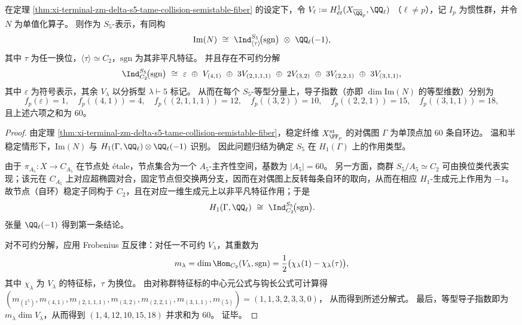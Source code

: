 \begin{theorem}\label{thm:xi-terminal-zm-delta-s5-tame-collision-monodromy-induced-sgn}
在定理 \ref{thm:xi-terminal-zm-delta-s5-tame-collision-semistable-fiber} 的设定下，令
\(
V_\ell:=H^1_{\acute e t}(X_{\overline{\QQ}_p},\QQ_\ell)
\)
（\(\ell\neq p\)），记 \(I_p\) 为惯性群，并令 \(N\) 为单值化算子。
则作为 \(S_5\)-表示，有同构
\[
\mathrm{Im}(N)\ \cong\ \Ind^{S_5}_{\langle\tau\rangle}\!\bigl(\mathrm{sgn}\bigr)\ \otimes\ \QQ_\ell(-1),
\]
其中 \(\tau\) 为任一换位，\(\langle\tau\rangle\simeq C_2\)，\(\mathrm{sgn}\) 为其非平凡特征。
并且存在不可约分解
\[
\Ind^{S_5}_{C_2}\!\bigl(\mathrm{sgn}\bigr)
\ \cong\
\varepsilon\ \oplus\ V_{(4,1)}\ \oplus\ 3V_{(2,1,1,1)}\ \oplus\ 2V_{(3,2)}\ \oplus\ 3V_{(2,2,1)}\ \oplus\ 3V_{(3,1,1)},
\]
其中 \(\varepsilon\) 为符号表示，其余 \(V_\lambda\) 以分拆型 \(\lambda\vdash 5\) 标记。
从而在每个 \(S_5\)-等型分量上，导子指数（亦即 \(\dim\mathrm{Im}(N)\) 的等型维数）分别为
\[
f_p(\varepsilon)=1,\quad
f_p((4,1))=4,\quad
f_p((2,1,1,1))=12,\quad
f_p((3,2))=10,\quad
f_p((2,2,1))=15,\quad
f_p((3,1,1))=18,
\]
且上述六项之和为 \(60\)。
\end{theorem}
\begin{proof}
由定理 \ref{thm:xi-terminal-zm-delta-s5-tame-collision-semistable-fiber}，稳定纤维 \(X^{\mathrm{st}}_{\FF_p}\) 的对偶图 \(\Gamma\) 为单顶点加 \(60\) 条自环边。
温和半稳定情形下，\(\mathrm{Im}(N)\) 与 \(H_1(\Gamma,\QQ_\ell)\otimes \QQ_\ell(-1)\) 识别。
因此问题归结为确定 \(S_5\) 在 \(H_1(\Gamma)\) 上的作用类型。
\par
由于 \(\pi_{A_5}:X\to C_{A_5}\) 在节点处 \'etale，节点集合为一个 \(A_5\)-主齐性空间，基数为 \(|A_5|=60\)。
另一方面，商群 \(S_5/A_5\simeq C_2\) 可由换位类代表实现；该元在 \(C_{A_5}\) 上对应超椭圆对合，固定节点但交换两分支，因而在对偶图上反转每条自环的取向，从而在相应 \(H_1\)-生成元上作用为 \(-1\)。
故节点（自环）稳定子同构于 \(C_2\)，且在对应一维生成元上以非平凡特征作用；于是
\[
H_1(\Gamma,\QQ_\ell)\ \cong\ \Ind^{S_5}_{C_2}\!\bigl(\mathrm{sgn}\bigr).
\]
张量 \(\QQ_\ell(-1)\) 得到第一条结论。
\par
对不可约分解，应用 Frobenius 互反律：对任一不可约 \(V_\lambda\)，其重数为
\[
m_\lambda=\dim\Hom_{C_2}(V_\lambda,\mathrm{sgn})
=\frac12\bigl(\chi_\lambda(1)-\chi_\lambda(\tau)\bigr),
\]
其中 \(\chi_\lambda\) 为 \(V_\lambda\) 的特征标，\(\tau\) 为换位。
由对称群特征标的中心元公式与钩长公式可计算得
\(
(m_{(1^5)},m_{(4,1)},m_{(2,1,1,1)},m_{(3,2)},m_{(2,2,1)},m_{(3,1,1)},m_{(5)})
=(1,1,3,2,3,3,0)
\)，
从而得到所述分解式。
最后，等型导子指数即为 \(m_\lambda\dim V_\lambda\)，从而得到 \((1,4,12,10,15,18)\) 并求和为 \(60\)。
证毕。
\end{proof}

